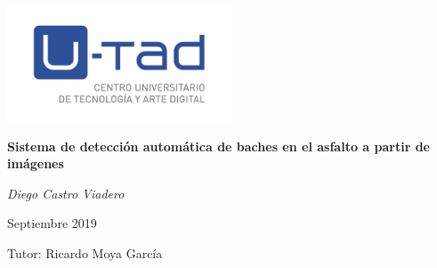 \documentclass[]{article}
\begin{document}
\begin{titlepage}
	\centering
	\includegraphics[width=0.5\textwidth]{images/logo_utad.jpg}\par\vspace{1cm}
	{\large\bfseries Sistema de detección automática de baches en el asfalto a partir de imágenes\par}
	\vspace{1.5cm}
	{\large \itshape Diego Castro Viadero\par}
	Septiembre 2019\par
	\vspace{1.5cm}
	{\small Tutor: Ricardo Moya García}
\end{titlepage}





\newpage


\newpage
{}
\tableofcontents{}

\newpage

\newpage

\newpage

\newpage

\newpage

\newpage

\newpage

\newpage

\newpage
\nocite{*}
\printbibliography[title={Referencias}]
\end{document}
